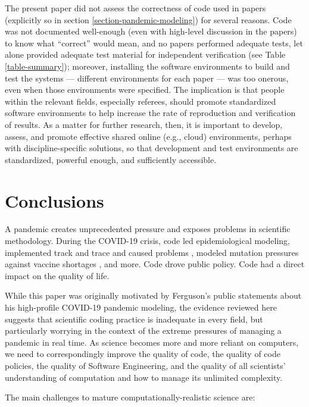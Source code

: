 \documentclass{comjnl}
\begin{document}
The present paper did not assess the correctness of code used in papers (explicitly so in section \ref{section-pandemic-modeling}) for several reasons. Code was not documented well-enough (even with high-level discussion in the papers) to know what ``correct'' would mean, and no papers performed adequate tests, let alone provided adequate test material for independent verification (see Table \ref{table-summary}); moreover, installing the software environments to build and test the systems --- different environments for each paper --- was too onerous, even when those environments were specified. The implication is that people within the relevant fields, especially referees, should promote standardized software environments to help increase the rate of reproduction and verification of results. As a matter for further research, then, it is important to develop, assess, and promote effective shared online (e.g., cloud) environments, perhaps with discipline-specific solutions, so that development and test environments are standardized, powerful enough, and sufficiently accessible.

\section{Conclusions}
A pandemic creates unprecedented pressure and exposes problems in scientific methodology. During the COVID-19 crisis, code led epidemiological modeling, implemented track and trace and caused problems \cite{excel-fiasco}, modeled mutation pressures against vaccine shortages \cite{science-delays}, and more. Code drove public policy. Code had a direct impact on the quality of life. 

While this paper was originally motivated by Ferguson's public statements  about his high-profile COVID-19 pandemic modeling, the evidence reviewed here suggests that scientific coding practice is inadequate in every field, but particularly worrying in the context of the extreme pressures of managing a pandemic in real time. As science becomes more and more reliant on computers, we need to correspondingly improve the quality of code, the quality of code policies, the quality of Software Engineering, and the quality of all scientists' understanding of computation and how to manage its unlimited complexity. 

The main challenges to mature computationally-realistic science are:
\end{document}
